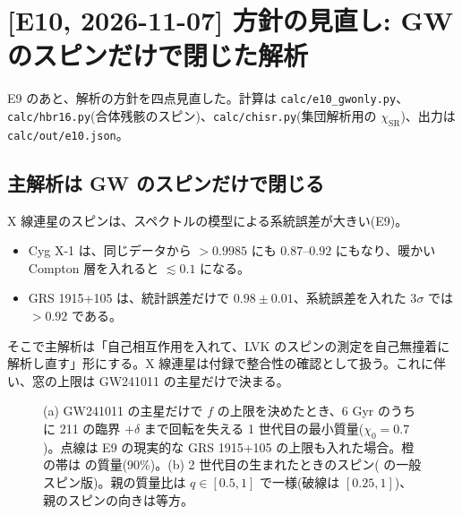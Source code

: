 \section{[E10, 2026-11-07] 方針の見直し: GW のスピンだけで閉じた解析}\label{sec:e10}

E9 のあと、解析の方針を四点見直した。計算は \texttt{calc/e10\_gwonly.py}、\texttt{calc/hbr16.py}(合体残骸のスピン)、\texttt{calc/chisr.py}(集団解析用の $\chi_\mathrm{SR}$)、出力は \texttt{calc/out/e10.json}。

\subsection{主解析は GW のスピンだけで閉じる}

X 線連星のスピンは、スペクトルの模型による系統誤差が大きい(E9)。
\begin{itemize}
\item Cyg X-1 は、同じデータから $>0.9985$ にも $0.87$--$0.92$ にもなり、暖かい Compton 層を入れると $\lesssim0.1$ になる。
\item GRS 1915+105 は、統計誤差だけで $0.98\pm0.01$、系統誤差を入れた 3$\sigma$ では $>0.92$ である。
\end{itemize}
そこで主解析は「自己相互作用を入れて、LVK のスピンの測定を自己無撞着に解析し直す」形にする。X 線連星は付録で整合性の確認として扱う。これに伴い、窓の上限は GW241011 の主星だけで決まる。

\begin{figure}[H]
\centering

\caption{(a) GW241011 の主星だけで $f$ の上限を決めたとき、6 Gyr のうちに 211 の臨界 $+\delta$ まで回転を失える 1 世代目の最小質量($\chi_0=0.7$)。点線は E9 の現実的な GRS 1915+105 の上限も入れた場合。橙の帯は  の質量(90\%)。(b) 2 世代目の生まれたときのスピン( の一般スピン版)。親の質量比は $q\in[0.5,1]$ で一様(破線は $[0.25,1]$)、親のスピンの向きは等方。}
\label{fig:e10}
\end{figure}

